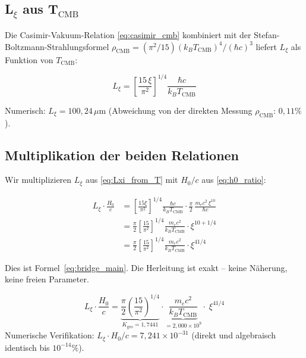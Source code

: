 \subsection{L\texorpdfstring{$_\xi$}{xi} aus T\texorpdfstring{$_\text{CMB}$}{CMB}}

Die Casimir-Vakuum-Relation \eqref{eq:casimir_cmb} kombiniert mit der
Stefan-Boltzmann-Strahlungsformel
$\rho_\text{CMB} = (\pi^2/15)(k_B T_\text{CMB})^4/(\hbar c)^3$
liefert $L_\xi$ als Funktion von $T_\text{CMB}$:

\begin{equation}
    L_\xi = \left[\frac{15\,\xi}{\pi^2}\right]^{1/4}
    \frac{\hbar c}{k_B T_\text{CMB}}
    \label{eq:Lxi_from_T}
\end{equation}

Numerisch: $L_\xi = 100{,}24\,\mu\text{m}$
(Abweichung von der direkten Messung $\rho_\text{CMB}$: $0{,}11\%$).

\subsection{Multiplikation der beiden Relationen}

Wir multiplizieren $L_\xi$ aus \eqref{eq:Lxi_from_T} mit $H_0/c$ aus
\eqref{eq:h0_ratio}:

\begin{align}
    L_\xi \cdot \frac{H_0}{c}
    &= \left[\frac{15\xi}{\pi^2}\right]^{1/4}
       \frac{\hbar c}{k_B T_\text{CMB}}
       \cdot \frac{\pi}{2}\,\frac{m_e c^2\,\xi^{10}}{\hbar c}
    \nonumber\\[6pt]
    &= \frac{\pi}{2}\left[\frac{15}{\pi^2}\right]^{1/4}
       \frac{m_e c^2}{k_B T_\text{CMB}}
       \cdot \xi^{10 + 1/4}
    \nonumber\\[6pt]
    &= \frac{\pi}{2}\left[\frac{15}{\pi^2}\right]^{1/4}
       \frac{m_e c^2}{k_B T_\text{CMB}}
       \cdot \xi^{41/4}
    \label{eq:bridge_derivation}
\end{align}

Dies ist Formel~\eqref{eq:bridge_main}. Die Herleitung ist exakt -- keine Näherung,
keine freien Parameter.

\begin{keyresult}
    \begin{equation}
        L_\xi \cdot \frac{H_0}{c}
        = \underbrace{\frac{\pi}{2}\left(\frac{15}{\pi^2}\right)^{1/4}}_{K_\text{geo} = 1{,}7441}
        \cdot
        \underbrace{\frac{m_e c^2}{k_B T_\text{CMB}}}_{= 2{,}000 \times 10^9}
        \cdot\; \xi^{41/4}
        \label{eq:bridge_boxed}
    \end{equation}
    Numerische Verifikation: $L_\xi \cdot H_0/c = 7{,}241 \times 10^{-31}$
    (direkt und algebraisch identisch bis $10^{-14}\%$).
\end{keyresult}

